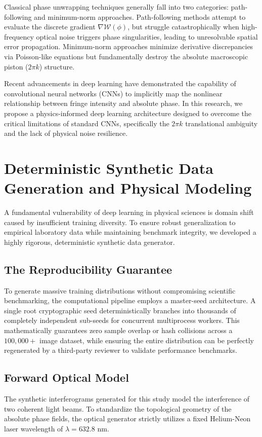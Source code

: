 \documentclass[11pt,onecolumn]{IEEEtran}
\begin{document}
Classical phase unwrapping techniques generally fall into two categories: path-following and minimum-norm approaches. Path-following methods attempt to evaluate the discrete gradient $\nabla \mathcal{W}(\phi)$, but struggle catastrophically when high-frequency optical noise triggers phase singularities, leading to unresolvable spatial error propagation. Minimum-norm approaches minimize derivative discrepancies via Poisson-like equations but fundamentally destroy the absolute macroscopic piston ($2\pi k$) structure.

Recent advancements in deep learning have demonstrated the capability of convolutional neural networks (CNNs) to implicitly map the nonlinear relationship between fringe intensity and absolute phase. In this research, we propose a physics-informed deep learning architecture designed to overcome the critical limitations of standard CNNs, specifically the $2\pi k$ translational ambiguity and the lack of physical noise resilience.

\section{Deterministic Synthetic Data Generation and Physical Modeling}

A fundamental vulnerability of deep learning in physical sciences is domain shift caused by insufficient training diversity. To ensure robust generalization to empirical laboratory data while maintaining benchmark integrity, we developed a highly rigorous, deterministic synthetic data generator.

\subsection{The Reproducibility Guarantee}
To generate massive training distributions without compromising scientific benchmarking, the computational pipeline employs a master-seed architecture. A single root cryptographic seed deterministically branches into thousands of completely independent sub-seeds for concurrent multiprocess workers. This mathematically guarantees zero sample overlap or hash collisions across a $100,000+$ image dataset, while ensuring the entire distribution can be perfectly regenerated by a third-party reviewer to validate performance benchmarks.

\subsection{Forward Optical Model}
The synthetic interferograms generated for this study model the interference of two coherent light beams. To standardize the topological geometry of the absolute phase fields, the optical generator strictly utilizes a fixed Helium-Neon laser wavelength of $\lambda = 632.8$ nm.
\end{document}
